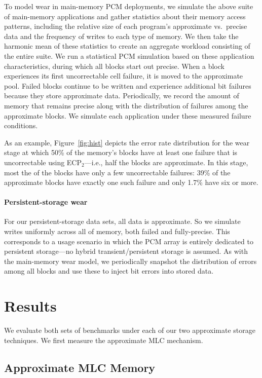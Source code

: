 \documentclass[prodmode,acmtocs]{acmsmall}
\begin{document}
To model wear in main-memory PCM deployments, we simulate the above suite of main-memory
applications and gather statistics about their memory access patterns,
including the relative size of each program's approximate vs.~precise
data and the frequency of writes to each type of memory. We then take
the harmonic mean of these statistics to create an aggregate workload
consisting of the entire suite. We run a statistical PCM
simulation based on these application characteristics, during which
all blocks start out precise. When a block experiences
its first uncorrectable cell failure, it is moved to the approximate
pool. Failed blocks
continue to be written and experience additional bit failures because they store
approximate data. Periodically, we record the amount of
memory that remains precise along with the distribution of failures
among the approximate blocks.
We simulate each application under these measured failure conditions.

As an example, Figure~\ref{fig:hist} depicts the error rate distribution for the
wear stage at which 50\% of the memory's blocks have at least one failure that
is uncorrectable using ECP$_2$---i.e.,
half the blocks are approximate. In this stage,
most the of the blocks have only a few uncorrectable failures: 39\% of the
approximate blocks have exactly one such failure and only 1.7\% have
six or more.



\paragraph{Persistent-storage wear} For our persistent-storage data sets, all
data is approximate. So we simulate writes uniformly across all of
memory, both failed and fully-precise. This corresponds to a usage scenario in
which the PCM array is entirely dedicated to persistent storage---no hybrid
transient/persistent storage is assumed. As with the main-memory wear model, we
periodically snapshot the distribution of errors among all blocks and use these
to inject bit errors into stored data.


\section{Results}
\label{sec:results}

We evaluate both sets of benchmarks under each of our two approximate storage
techniques.
We first measure the approximate MLC mechanism.

\subsection{Approximate MLC Memory}
\end{document}
